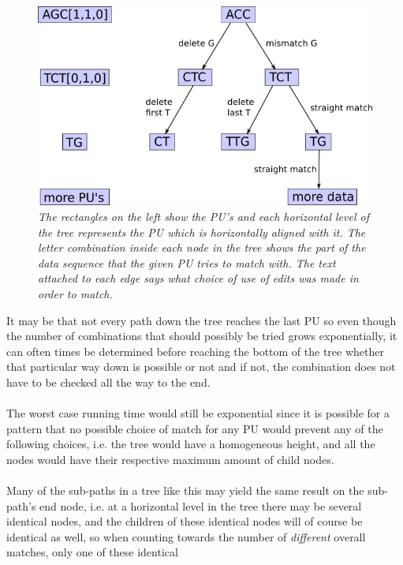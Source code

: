 \documentclass[12pt]{article}
\newcommand{\pu}{PU }
\newcommand{\pus}{PU's }
\begin{document}
\begin{figure}[H]
\begin{center}
\includegraphics[scale=0.75]{Diagrams/tree.png}
\end{center}
\caption{\textit{The rectangles on the left show the \pus and each horizontal level of the tree represents the \pu 
which is horizontally aligned with it. The letter combination inside each node in the tree shows the part of the data sequence
that the given \pu tries to match with. The text attached to each edge says what choice of use of edits was made 
in order to match.}}
\end{figure}
\noindent It may be that not every path down the tree reaches the last \pu so even though the number of combinations that 
should possibly be tried grows exponentially, it can often times be determined before
reaching the bottom of the tree whether that particular way down is possible or not and if not, the combination does
not have to be checked all the way to the end. \\ \\
The worst case running time would still be exponential since it is possible for a pattern that no possible choice of match
for any \pu would prevent any of the following choices, i.e. the tree would have a homogeneous height, and
all the nodes would have their respective maximum amount of child nodes. \\ \\
Many of the sub-paths in a tree like this may yield the same result on the sub-path's end node, i.e. at a horizontal
level in the tree there may be several identical nodes, and the children of these identical nodes will of course be
identical as well, so when counting towards the number of \emph{different} overall matches, only one of these identical
\end{document}
